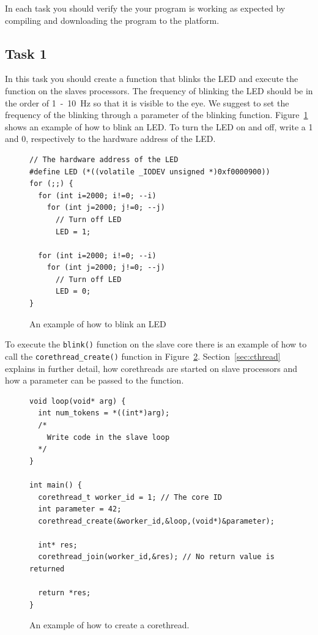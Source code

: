 \documentclass[a4paper,fontsize=10pt,twoside,DIV15,BCOR12mm,headinclude=true,footinclude=false,pagesize,bibtotoc]{scrbook}
\newcommand{\code}[1]{{\texttt{#1}}}
\begin{document}
\noindent In each task you should verify the your program is working as expected by compiling and downloading the program to the platform.

\subsection{Task 1}
In this task you should create a function that blinks the LED and execute the function on the slaves processors.
The frequency of blinking the LED should be in the order of 1~-~10~Hz so that it is visible to the eye.
We suggest to set the frequency of the blinking through a parameter of the blinking function.
Figure~\ref{fig:ctrl_led} shows an example of how to blink an LED.
To turn the LED on and off, write a 1 and 0, respectively to the hardware address of the LED. 

\begin{figure}
\begin{Verbatim}[xleftmargin=1cm,frame=single,framesep=3mm]
// The hardware address of the LED
#define LED (*((volatile _IODEV unsigned *)0xf0000900))
for (;;) {
  for (int i=2000; i!=0; --i)
    for (int j=2000; j!=0; --j)
      // Turn off LED
      LED = 1;

  for (int i=2000; i!=0; --i)
    for (int j=2000; j!=0; --j)
      // Turn off LED
      LED = 0;
}
\end{Verbatim}
\caption{\label{fig:ctrl_led}An example of how to blink an LED}
\end{figure}

To execute the \code{blink()} function on the slave core there is an example of
how to call the \code{corethread\_create()} function in Figure~\ref{fig:corethread}.
Section~\ref{sec:cthread} explains in further detail, how corethreads are started
on slave processors and how a parameter can be passed to the function.

\begin{figure}
\begin{Verbatim}[xleftmargin=1cm,frame=single,framesep=3mm]
void loop(void* arg) {
  int num_tokens = *((int*)arg);
  /*
    Write code in the slave loop
  */
}

int main() {
  corethread_t worker_id = 1; // The core ID
  int parameter = 42;
  corethread_create(&worker_id,&loop,(void*)&parameter);  

  int* res;
  corethread_join(worker_id,&res); // No return value is returned

  return *res;  
}
\end{Verbatim}
\caption{\label{fig:corethread}An example of how to create a corethread.}
\end{figure}
\end{document}
